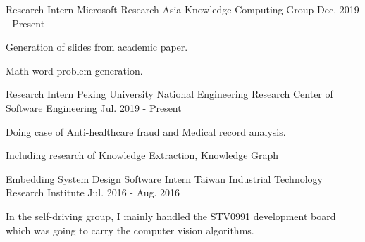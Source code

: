 

\begin{cventries}

  \cventry
    {Research Intern} %
    {Microsoft Research Asia Knowledge Computing Group} %
    {} %
    {Dec. 2019 - Present} %
    {
      \begin{cvitems} %
        \item {Generation of slides from academic paper.}
        \item {Math word problem generation.}
      \end{cvitems}
    }

  \cventry
    {Research Intern} %
    {Peking University National Engineering Research Center of Software Engineering} %
    {} %
    {Jul. 2019 - Present} %
    {
      \begin{cvitems} %
        \item {Doing case of Anti-healthcare fraud and Medical record analysis.}
        \item {Including research of Knowledge Extraction, Knowledge Graph}
      \end{cvitems}
    }

  \cventry
    {Embedding System Design Software Intern} %
    {Taiwan Industrial Technology Research Institute} %
    {} %
    {Jul. 2016 - Aug. 2016} %
    {
      \begin{cvitems} %
        \item {In the self-driving group, I mainly handled the STV0991 development board which was going to carry the computer vision algorithms.}
      \end{cvitems}
    }

\end{cventries}

